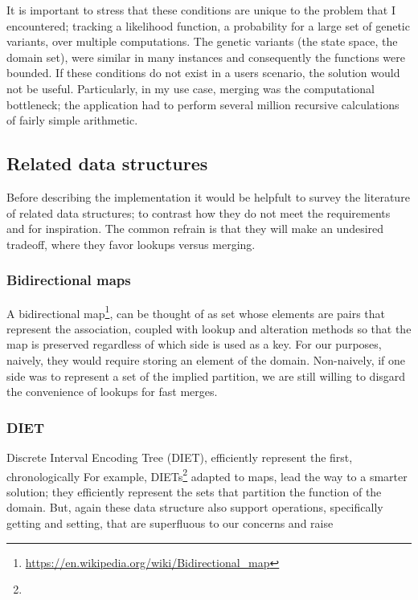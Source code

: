 \documentclass{article}
\begin{document}
It is important to stress that these conditions are unique to the problem that
I encountered;
tracking a likelihood function,
a probability for a large set of genetic variants,
over multiple computations.
The genetic variants (the state space, the domain set),
were similar in many instances and consequently the functions were bounded.
If these conditions do not exist in a users scenario,
the solution would not be useful.
Particularly, in my use case, merging was the computational bottleneck;
the application had to perform several million recursive calculations of fairly
simple arithmetic.

\subsection{Related data structures}

Before describing the implementation it would be helpfult to survey the
literature of related data structures;
to contrast how they do not meet the requirements and 
for inspiration.
The common refrain is that they will make an undesired tradeoff,
where they favor lookups versus merging.

\subsubsection{Bidirectional maps}

A bidirectional map\footnote{\url{https://en.wikipedia.org/wiki/Bidirectional_map}},
can be thought of as set whose elements are pairs that represent the association,
coupled with lookup and alteration methods so that the map is preserved regardless
of which side is used as a key.
For our purposes, naively, they would require storing an element of the domain.
Non-naively, if one side was to represent a set of the implied partition,
we are still willing to disgard the convenience of lookups for fast merges.

\subsubsection{DIET}

Discrete Interval Encoding Tree \cite{Erwig1993} (DIET),
efficiently
represent the first, chronologically
For example, DIETs\footnote{}
adapted to maps,
lead the way to a smarter solution;
they efficiently represent the sets that partition the function of the domain.
But, again these data structure also support operations,
specifically getting and setting,
that are superfluous to our concerns and raise 
\end{document}
